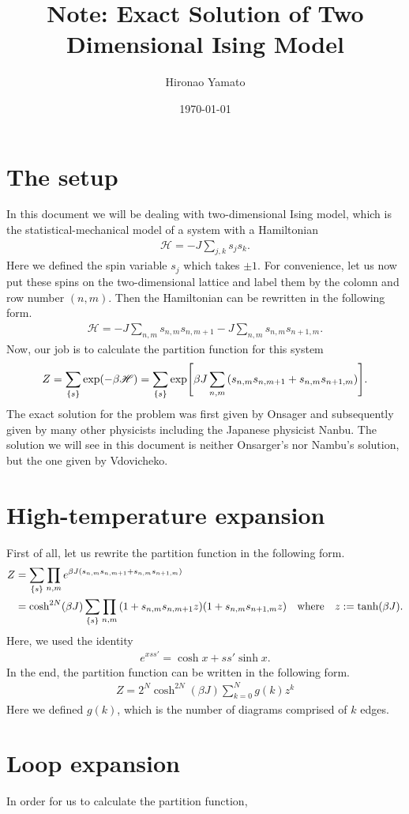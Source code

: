 \documentclass[aps, 12pt]{revtex4-2}
\begin{document}
\title{Note: Exact Solution of Two Dimensional Ising Model}
\author{Hironao Yamato}
\date{\today}
\maketitle

\newcommand{\square}{\tikz\draw (0em, 0em) -- (-1em, 1em) -- (-1em, -1em) -- (1em, -1em) -- cycle;}
\section{The setup}
In this document we will be dealing with two-dimensional Ising model, which is the statistical-mechanical model of a system with a Hamiltonian
\begin{align*}
  \mathscr{H} = - J \sum_{j,k} s_js_k.
\end{align*}
Here we defined the spin variable $s_j$ which takes $\pm 1$. For convenience, let us now put these spins on the two-dimensional lattice and label them by the colomn and row number $(n ,m)$. Then the Hamiltonian can be rewritten in the following form.
\begin{align*}
  \mathscr{H} = - J \sum_{n, m}s_{n, m}s_{n, m+1} - J\sum_{n, m} s_{n, m}s_{n+1, m}.
\end{align*}
Now, our job is to calculate the partition function for this system
\begin{align*}
  Z = \sum_{\qty{s}} \exp(-\beta \mathscr{H}) = \sum_{\qty{s}}\exp[\beta J \sum_{n, m}\qty(s_{n,m}s_{n,m+1} + s_{n, m}s_{n+1,m})].
\end{align*}
The exact solution for the problem was first given by Onsager and subsequently given by many other physicists including the Japanese physicist Nanbu. The solution we will see in this document is neither Onsarger's nor Nambu's solution, but the one given by Vdovicheko.

\section{High-temperature expansion}
First of all, let us rewrite the partition function in the following form.
\begin{align*}
  Z &= \sum_{\qty{s}} \prod_{n, m} e^{\beta J\qty(s_{n,m}s_{n,m+1} + s_{n,m}s_{n+1,m})} \\
  &= \cosh^{2N}(\beta J)\sum_{\qty{s}} \prod_{n, m}\qty(1+ s_{n,m}s_{n,m+1}z)\qty(1+ s_{n,m}s_{n+1,m}z)
  \quad\mathrm{where}\quad z := \tanh(\beta J).
\end{align*}
Here, we used the identity
\begin{align*}
  e^{x ss'} = \cosh x + ss' \sinh x.
\end{align*}
In the end, the partition function can be written in the following form.
\begin{align*}
  Z = 2^N \cosh^{2N}(\beta J) \sum_{k = 0}^{N} g(k)z^k
\end{align*}
Here we defined $g(k)$, which is the number of diagrams comprised of $k$ edges.

\section{Loop expansion}
In order for us to calculate the partition function, 

\end{document}
